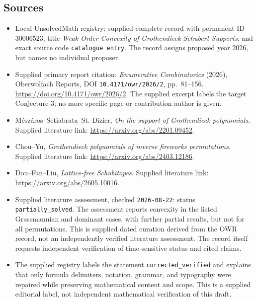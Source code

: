 \documentclass[11pt]{article}
\begin{document}
\subsection{Sources}
\begin{itemize}
\item Local UnsolvedMath registry: supplied complete record with permanent ID \(30006523\), title \emph{Weak-Order Convexity of Grothendieck Schubert Supports}, and exact source code \texttt{catalogue entry}. The record assigns proposed year \(2026\), but names no individual proposer.
\item Supplied primary report citation: \emph{Enumerative Combinatorics} (2026), Oberwolfach Reports, DOI \texttt{10.4171/owr/2026/2}, pp.\ 81--156. \url{https://doi.org/10.4171/owr/2026/2}. The supplied excerpt labels the target Conjecture 3; no more specific page or contribution author is given.
\item Mészáros--Setiabrata--St. Dizier, \emph{On the support of Grothendieck polynomials}. Supplied literature link: \url{https://arxiv.org/abs/2201.09452}.
\item Chou--Yu, \emph{Grothendieck polynomials of inverse fireworks permutations}. Supplied literature link: \url{https://arxiv.org/abs/2403.12186}.
\item Dou--Fan--Liu, \emph{Lattice-free Schubitopes}. Supplied literature link: \url{https://arxiv.org/abs/2605.10016}.
\item Supplied literature assessment, checked \texttt{2026-08-22}: status \texttt{partially\_solved}. The assessment reports convexity in the listed Grassmannian and dominant cases, with further partial results, but not for all permutations. This is supplied dated curation derived from the OWR record, not an independently verified literature assessment. The record itself requests independent verification of time-sensitive status and cited claims.
\item The supplied registry labels the statement \texttt{corrected\_verified} and explains that only formula delimiters, notation, grammar, and typography were repaired while preserving mathematical content and scope. This is a supplied editorial label, not independent mathematical verification of this draft.
\end{itemize}
\end{document}
